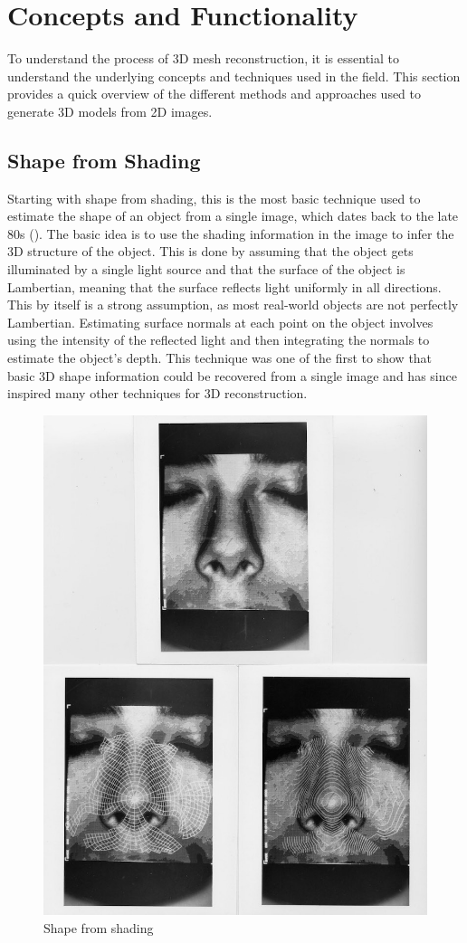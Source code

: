

\section{Concepts and Functionality}
To understand the process of 3D mesh reconstruction, it is essential to understand the underlying concepts and techniques used in the field. This section provides a quick overview of the different methods and approaches used to generate 3D models from 2D images.
\subsection{Shape from Shading}
Starting with shape from shading, this is the most basic technique used to estimate the shape of an object from a single image, which dates back to the late 80s (\textcite{horn_shape_1989}).
The basic idea is to use the shading information in the image to infer the 3D structure of the object. This is done by assuming that the object gets illuminated by a single light source and that the surface of the object is Lambertian, meaning that the surface reflects light uniformly in all directions. This by itself is a strong assumption, as most real-world objects are not perfectly Lambertian.
Estimating surface normals at each point on the object involves using the intensity of the reflected light and then integrating the normals to estimate the object's depth. This technique was one of the first to show that basic 3D shape information could be recovered from a single image and has since inspired many other techniques for 3D reconstruction.
\begin{figure}
    \centering
    \includegraphics[width=0.5\linewidth]{images/shape_from_shading.jpg}
    \caption{Shape from shading \autocite{horn_shape_1989}}
    \label{fig:shape_from_shading}
\end{figure}

